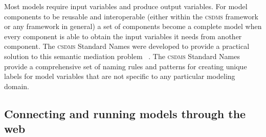 \documentclass[11pt, oneside]{amsart}
\newcommand{\huttonnote}[1]{ {\textcolor{magenta}    { ***Eric:      #1 }}}
\DeclareRobustCommand{\csdms}{\textsc{csdms}}
\begin{document}
Most models require input variables and produce output variables. For model
components to be reusable and interoperable (either within the \csdms{}
framework or any framework in general)
a set of components become a complete model when every component is able to
obtain the input variables it needs from another component. The \csdms{}
Standard Names were developed to provide a practical solution to this
semantic mediation problem ~\cite{peckham2012component, syvitski2014plug}.
The \csdms{} Standard Names provide a comprehensive set of naming rules and
patterns for creating unique labels for model variables that are not specific
to any particular modeling domain.



\subsection{Connecting and running models through the web}
\label{sec:wmt}

\end{document}
